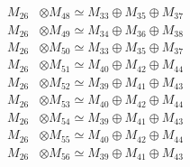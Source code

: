 \begin{align*}
M_{26} &\otimes M_{48} \simeq M_{33} \oplus M_{35} \oplus M_{37} \\
M_{26} &\otimes M_{49} \simeq M_{34} \oplus M_{36} \oplus M_{38} \\
M_{26} &\otimes M_{50} \simeq M_{33} \oplus M_{35} \oplus M_{37} \\
M_{26} &\otimes M_{51} \simeq M_{40} \oplus M_{42} \oplus M_{44} \\
M_{26} &\otimes M_{52} \simeq M_{39} \oplus M_{41} \oplus M_{43} \\
M_{26} &\otimes M_{53} \simeq M_{40} \oplus M_{42} \oplus M_{44} \\
M_{26} &\otimes M_{54} \simeq M_{39} \oplus M_{41} \oplus M_{43} \\
M_{26} &\otimes M_{55} \simeq M_{40} \oplus M_{42} \oplus M_{44} \\
M_{26} &\otimes M_{56} \simeq M_{39} \oplus M_{41} \oplus M_{43} \\
\end{align*}

